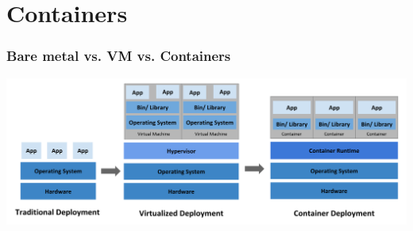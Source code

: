 \documentclass[presentation]{beamer}\mode<presentation>{\usetheme{AMSBolognaFC}}
\begin{document}
\section{Containers}

\begin{frame}
    \frametitle{Bare metal vs. VM vs. Containers}

    \begin{center}
        \includegraphics[width=\linewidth]{img/vm-vs-containers.png}
    \end{center}

\end{frame}
\end{document}

